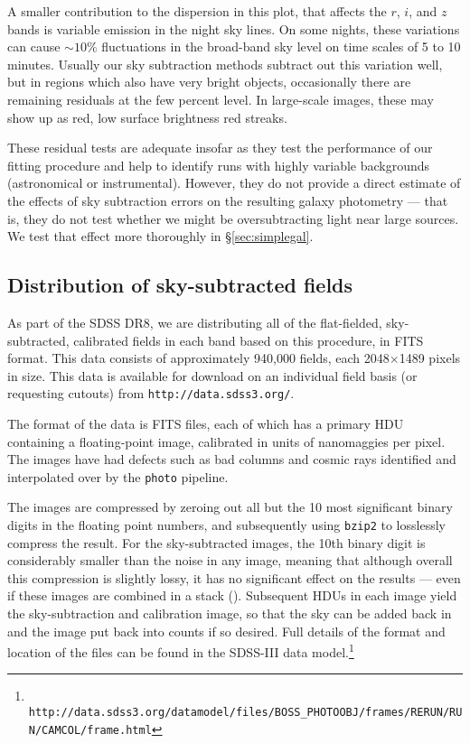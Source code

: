 \documentclass[10pt,preprint]{aastex}
\begin{document}
A smaller contribution to the dispersion in this plot, that affects
the $r$, $i$, and $z$ bands is variable emission in the night sky
lines. On some nights, these variations can cause $\sim 10\%$
fluctuations in the broad-band sky level on time scales of 5 to 10
minutes. Usually our sky subtraction methods subtract out this
variation well, but in regions which also have very bright objects,
occasionally there are remaining residuals at the few percent
level. In large-scale images, these may show up as red, low surface
brightness red streaks.

These residual tests are adequate insofar as they test the performance
of our fitting procedure and help to identify runs with highly
variable backgrounds (astronomical or instrumental).  However, they do
not provide a direct estimate of the effects of sky subtraction errors
on the resulting galaxy photometry --- that is, they do not test
whether we might be oversubtracting light near large sources.  We test
that effect more thoroughly in \S\ref{sec:simplegal}.

\subsection{Distribution of sky-subtracted fields}
\label{sec:fields}

As part of the SDSS DR8, we are distributing all of the flat-fielded,
sky-subtracted, calibrated fields in each band based on this
procedure, in FITS format. This data consists of approximately 940,000
fields, each 2048$\times$1489 pixels in size. This data is available
for download on an individual field basis (or requesting cutouts) from
{\tt http://data.sdss3.org/}.

The format of the data is FITS files, each of which has a primary HDU
containing a floating-point image, calibrated in units of nanomaggies
per pixel. The images have had defects such as bad columns and cosmic
rays identified and interpolated over by the {\tt photo} pipeline.

The images are compressed by zeroing out all but the 10 most
significant binary digits in the floating point numbers, and
subsequently using {\tt bzip2} to losslessly compress the result. For
the sky-subtracted images, the 10th binary digit is considerably
smaller than the noise in any image, meaning that although overall
this compression is slightly lossy, it has no significant effect on
the results --- even if these images are combined in a stack
(\citealt{pricewhelan10a}).  Subsequent HDUs in each image yield the
sky-subtraction and calibration image, so that the sky can be added
back in and the image put back into counts if so desired. Full details
of the format and location of the files can be found in the SDSS-III
data model.\footnote{\tt
  http://data.sdss3.org/datamodel/files/BOSS\_PHOTOOBJ/frames/RERUN/RUN/CAMCOL/frame.html}
\end{document}
